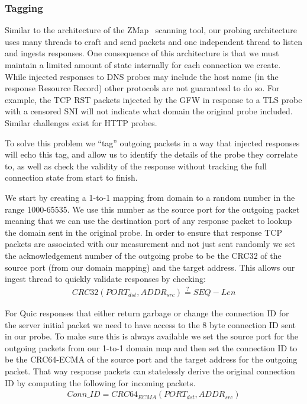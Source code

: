 \subsubsection{Tagging}

Similar to the architecture of the ZMap~\cite{Durumeric13zmap} scanning tool,
our probing architecture uses many threads to craft and send packets and one
independent thread to listen and ingests responses. One consequence of this
architecture is that we must maintain a limited amount of state internally for
each connection we create. While injected responses to DNS probes may include
the host name (in the response Resource Record) other protocols are not
guaranteed to do so. For example, the TCP RST packets injected by the GFW in
response to a TLS probe with a censored SNI will not indicate what domain the
original probe included. Similar challenges exist for HTTP probes.

To solve this problem we ``tag'' outgoing packets in a way that injected
responses will echo this tag, and allow us to identify the details of the probe
they correlate to, as well as check the
validity of the response without tracking the full connection state from start
to finish.

We start by creating a 1-to-1 mapping from domain to a random number in the
range 1000-65535. We use this number as the source port for the outgoing packet
meaning that we can use the destination port of any response packet to lookup
the domain sent in the original probe. In order to ensure that response TCP
packets are associated with our measurement and not just sent randomly we set
the acknowledgement number of the outgoing probe to be the CRC32 of the source
port (from our domain mapping) and the target address. This allows our ingest
thread to quickly validate responses by checking:
\begin{gather*}
CRC32(PORT_{dst},ADDR_{src}) \stackrel{?}{=} SEQ - Len
\end{gather*}

For Quic responses that either return garbage or change the connection ID for
the server initial packet we need to have access to the 8 byte connection ID
sent in our probe. To make sure this is always available we set the source port
for the outgoing packets from our 1-to-1 domain map and then set the connection
ID to be the CRC64-ECMA of the source port and the target address for the
outgoing packet. That way response packets can statelessly derive the original
connection ID by computing the following for incoming packets.
\begin{gather*}
Conn\_ID = CRC64_{ECMA}(PORT_{dst},ADDR_{src})
\end{gather*}
\fi


